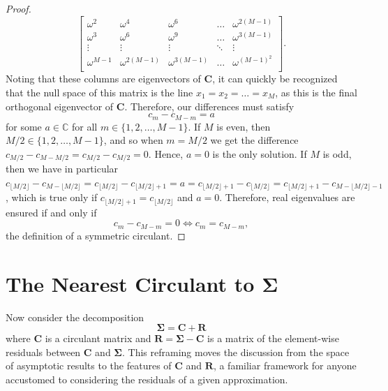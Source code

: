 \documentclass[letterpaper,12pt,oneside,final]{article}
\newcommand{\m}[1]{\mathbf{#1}}               %
\newcommand{\sm}[1]{\boldsymbol{#1}}   %
\newcommand{\field}[1]{\mathbb{#1}}
\newcommand{\Complex}{\field{C}}
\begin{document}
\begin{proof}
$$\begin{bmatrix}
  \omega^2 & \omega^4 & \omega^6 & \dots & \omega^{2(M-1)} \\
  \omega^3 & \omega^6 & \omega^9 & \dots & \omega^{3(M-1)} \\
  \vdots & \vdots & \vdots & \ddots & \vdots \\
  \omega^{M-1} & \omega^{2(M-1)} & \omega^{3(M-1)} & \dots & \omega^{(M-1)^2} \\
  \end{bmatrix}.$$
  Noting that these columns are eigenvectors of $\m{C}$, it can quickly be recognized that the null space of this matrix is the line $x_1 = x_2 = \dots = x_M$, as this is the final orthogonal eigenvector of $\m{C}$. Therefore, our differences must satisfy
  $$c_m - c_{M-m} = a$$
  for some $a \in \Complex$ for all $m \in \{1, 2, \dots, M-1\}$. If $M$ is even, then $M/2 \in \{1, 2, \dots, M-1\}$, and so when $m = M/2$ we get the difference $c_{M/2} - c_{M - M/2} = c_{M/2} - c_{M/2} = 0$. Hence, $a = 0$ is the only solution. If $M$ is odd, then we have in particular $c_{\lfloor M/2 \rfloor} - c_{M - \lfloor M/2 \rfloor} = c_{\lfloor M/2 \rfloor} - c_{\lfloor M/2 \rfloor + 1} = a = c_{\lfloor M/2 \rfloor + 1} - c_{\lfloor M/2 \rfloor} = c_{\lfloor M/2 \rfloor + 1} - c_{M - \lfloor M/2 \rfloor - 1}$, which is true only if $c_{\lfloor M/2 \rfloor + 1} = c_{\lfloor M/2 \rfloor}$ and $a = 0$. Therefore, real eigenvalues are ensured if and only if
  $$c_m - c_{M-m} = 0 \iff c_m = c_{M-m},$$
  the definition of a symmetric circulant.
\end{proof}

\section{The Nearest Circulant to $\m{\Sigma}$} \label{c:multipleTesting:nearestCirc}

Now consider the decomposition
\begin{equation} \label{eq:circDecomp}
  \sm{\Sigma} = \m{C} + \m{R}
\end{equation}
where $\m{C}$ is a circulant matrix and $\m{R} = \sm{\Sigma} - \m{C}$ is a matrix of the element-wise residuals between $\m{C}$ and $\sm{\Sigma}$. This reframing moves the discussion from the space of asymptotic results to the features of $\m{C}$ and $\m{R}$, a familiar framework for anyone accustomed to considering the residuals of a given approximation.
\end{document}
